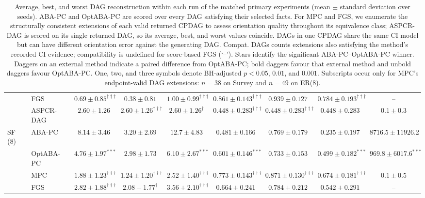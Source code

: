 \begin{table}[t]
{\begin{tabular}{llccccccc}
 & FGS & $\mathbf{0.69\pm0.85}^{\dagger\dagger\dagger}$ & $0.38\pm0.81$ & $\mathbf{1.00\pm0.99}^{\dagger\dagger\dagger}$ & $\mathbf{0.861\pm0.143}^{\dagger\dagger\dagger}$ & $0.939\pm0.127$ & $\mathbf{0.784\pm0.193}^{\dagger\dagger\dagger}$ & --\\
 & ASPCR-DAG & $2.60\pm1.26$ & $2.60\pm1.26^{\dagger\dagger\dagger}$ & $\mathbf{2.60\pm1.26}^{\dagger}$ & $0.448\pm0.283^{\dagger\dagger\dagger}$ & $0.448\pm0.283^{\dagger\dagger\dagger}$ & $0.448\pm0.283$ & $0.1\pm0.3$\\
\midrule
SF (8) & ABA-PC & $8.14\pm3.46$ & $3.20\pm2.69$ & $12.7\pm4.83$ & $0.481\pm0.166$ & $0.769\pm0.179$ & $0.235\pm0.197$ & $8716.5\pm11926.2$\\
 & OptABA-PC & $\mathbf{4.76\pm1.97}^{***}$ & $2.98\pm1.73$ & $\mathbf{6.10\pm2.67}^{***}$ & $\mathbf{0.601\pm0.146}^{***}$ & $0.733\pm0.153$ & $\mathbf{0.499\pm0.182}^{***}$ & $\mathbf{969.8\pm6017.6}^{***}$\\
 & MPC & $\mathbf{1.88\pm1.23}^{\dagger\dagger\dagger}$ & $\mathbf{1.24\pm1.20}^{\dagger\dagger\dagger}$ & $\mathbf{2.52\pm1.40}^{\dagger\dagger\dagger}$ & $\mathbf{0.773\pm0.143}^{\dagger\dagger\dagger}$ & $\mathbf{0.871\pm0.130}^{\dagger\dagger\dagger}$ & $\mathbf{0.674\pm0.181}^{\dagger\dagger\dagger}$ & $0.1\pm0.5$\\
 & FGS & $\mathbf{2.82\pm1.88}^{\dagger\dagger\dagger}$ & $\mathbf{2.08\pm1.77}^{\dagger}$ & $\mathbf{3.56\pm2.10}^{\dagger\dagger\dagger}$ & $0.664\pm0.241$ & $0.784\pm0.212$ & $0.542\pm0.291$ & --\\
\bottomrule
\end{tabular}
}%
\caption{Average, best, and worst DAG reconstruction within each run of the matched primary experiments (mean $\pm$ standard deviation over seeds). ABA-PC and OptABA-PC are scored over every DAG satisfying their selected facts. For MPC and FGS, we enumerate the structurally consistent extensions of each valid returned CPDAG to assess orientation quality throughout its equivalence class; ASPCR-DAG is scored on its single returned DAG, so its average, best, and worst values coincide. DAGs in one CPDAG share the same CI model but can have different orientation error against the generating DAG. Compat. DAGs counts extensions also satisfying the method's recorded CI evidence; compatibility is undefined for score-based FGS (`--'). Stars identify the significant ABA-PC--OptABA-PC winner. Daggers on an external method indicate a paired difference from OptABA-PC; bold daggers favour that external method and unbold daggers favour OptABA-PC. One, two, and three symbols denote BH-adjusted $p<0.05$, $0.01$, and $0.001$. Subscripts occur only for MPC's endpoint-valid DAG extensions: $n=38$ on Survey and $n=49$ on ER(8).}
\label{tab:final-dag-ranges}
\end{table}
